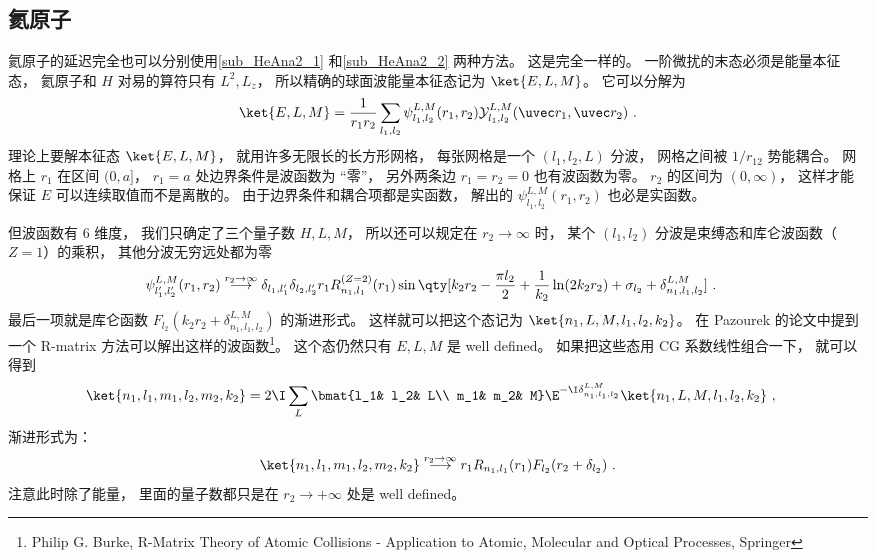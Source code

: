 \subsection{氦原子}
氦原子的延迟完全也可以分别使用\autoref{sub_HeAna2_1} 和\autoref{sub_HeAna2_2} 两种方法。 这是完全一样的。 一阶微扰的末态必须是能量本征态， 氦原子和 $H$ 对易的算符只有 $L^2, L_z$， 所以精确的球面波能量本征态记为 $\ket{E,L,M}$。 它可以分解为
\begin{equation}
\ket{E,L,M} = \frac{1}{r_1r_2}\sum_{l_1,l_2}\psi_{l_1,l_2}^{L, M}(r_1, r_2)\mathcal Y_{l_1,l_2}^{L, M}(\uvec r_1, \uvec r_2)~.
\end{equation}
理论上要解本征态 $\ket{E,L,M}$， 就用许多无限长的长方形网格， 每张网格是一个 $(l_1,l_2,L)$ 分波， 网格之间被 $1/r_{12}$ 势能耦合。 网格上 $r_1$ 在区间 $(0,a]$， $r_1 = a$ 处边界条件是波函数为 “零”， 另外两条边 $r_1 = r_2 = 0$ 也有波函数为零。 $r_2$ 的区间为 $(0,\infty)$， 这样才能保证 $E$ 可以连续取值而不是离散的。 由于边界条件和耦合项都是实函数， 解出的 $\psi_{l_1,l_2}^{L, M}(r_1, r_2)$ 也必是实函数。

但波函数有 6 维度， 我们只确定了三个量子数 $H,L,M$， 所以还可以规定在 $r_2\to\infty$ 时， 某个 $(l_1,l_2)$ 分波是束缚态和库仑波函数（$Z=1$）的乘积， 其他分波无穷远处都为零
\begin{equation}
\begin{aligned}
&\psi_{l'_1,l'_2}^{L, M}(r_1, r_2) \overset{r_2\to\infty}{\longrightarrow} \delta_{l_1,l'_1}\delta_{l_2,l'_2} r_1 R_{n_1,l_1}^{(Z=2)}(r_1)
\sin\qty[k_2 r_2 - \frac{\pi l_2}{2} +\frac{1}{k_2}\ln(2k_2 r_2) + \sigma_{l_2} + \delta_{n_1,l_1,l_2}^{L,M}]~.
\end{aligned}
\end{equation}
最后一项就是库仑函数 $F_{l_2}(k_2 r_2 + \delta_{n_1,l_1,l_2}^{L,M})$ 的渐进形式。 这样就可以把这个态记为 $\ket{n_1,L,M,l_1,l_2,k_2}$。 在 Pazourek 的论文中提到一个 R-matrix 方法可以解出这样的波函数\footnote{Philip G. Burke, R-Matrix Theory of Atomic Collisions - Application to Atomic, Molecular and Optical Processes, Springer}。 这个态仍然只有 $E,L,M$ 是 well defined。 如果把这些态用 CG 系数线性组合一下， 就可以得到
\begin{equation}
\begin{aligned}
&\ket{n_1,l_1,m_1,l_2,m_2,k_2}
= 2\I \sum_{L} \bmat{l_1& l_2& L\\ m_1& m_2& M} \E^{-\I \delta_{n_1,l_1,l_2}^{L,M}} \ket{n_1,L,M,l_1,l_2,k_2}~,
\end{aligned}
\end{equation}
渐进形式为：
\begin{equation}
\ket{n_1,l_1,m_1, l_2,m_2,k_2} \overset{r_2\to\infty}{\longrightarrow} r_1 R_{n_1,l_1}(r_1) F_{l_2}(r_2 + \delta_{l_2})~.
\end{equation}
注意此时除了能量， 里面的量子数都只是在 $r_2\to+\infty$ 处是 well defined。

